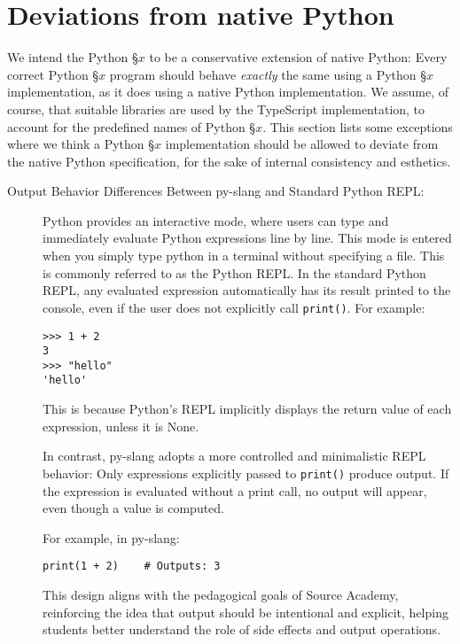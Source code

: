 \section*{Deviations from native Python}

We intend the Python \S $x$ to be a conservative extension of 
native Python: Every correct Python \S $x$ program should behave 
\emph{exactly} the same using a Python \S $x$ implementation, as it does 
using a native Python implementation. We assume, of course, that 
suitable libraries are used by the TypeScript implementation, to 
account for the predefined names of Python \S $x$. 
This section lists some exceptions where we think a Python \S $x$ 
implementation should be allowed to deviate from the native Python 
specification, for the sake of internal consistency and esthetics.

\begin{description}
\item[{Output Behavior Differences Between py-slang and Standard Python REPL:}]
  Python provides an interactive mode, where users can type and immediately 
  evaluate Python expressions line by line. This mode is entered when you 
  simply type python in a terminal without specifying a file. This is commonly 
  referred to as the Python REPL. 
  In the standard Python REPL, any evaluated expression automatically has its 
  result printed to the console, even if the user does not explicitly call 
  \texttt{print()}. For example:

  \begin{lstlisting}
>>> 1 + 2
3
>>> "hello"
'hello'
  \end{lstlisting}

  This is because Python's REPL implicitly displays the return value of each 
  expression, unless it is None.

  In contrast, py-slang adopts a more controlled and minimalistic REPL behavior:
  Only expressions explicitly passed to \texttt{print()} produce output. If the 
  expression is evaluated without a print call, no output will appear, even 
  though a value is computed.

  For example, in py-slang:

  \begin{lstlisting}
print(1 + 2)  	# Outputs: 3
  \end{lstlisting}

  This design aligns with the pedagogical goals of Source Academy, reinforcing 
  the idea that output should be intentional and explicit, helping students 
  better understand the role of side effects and output operations.
\end{description}